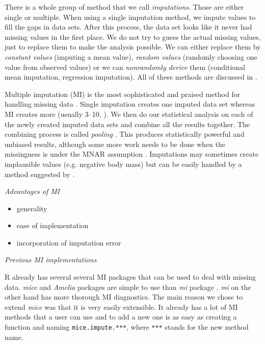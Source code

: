 \documentclass[hidelinks,a4paper]{article}
\renewcommand{\subsection}[1]{%
\bigskip
\begin{center}
\begin{large}
\normalfont\itshape #1
\end{large}
\end{center}}
\begin{document}
\begin{multicols}{2}
There is a whole group of method that we call \emph{imputations}. Those are either single or multiple. When using a single imputation method, we impute values to fill the gaps in data sets. After this process, the data set looks like it never had missing values in the first place. We do not try to guess the actual missing values, just to replace them to make the analysis possible. We can either replace them by \emph{constant values} (imputing a mean value), \emph{random values} (randomly choosing one value from observed values) or we can \emph{nonrandomly derive} them (conditional mean imputation, regression imputation). All of these methods are discussed in \cite{Donders06}.

Multiple imputation (MI) is the most sophisticated and praised method for handling missing data \cite{allison2001missing,Schafer1997}. Single imputation creates one imputed data set whereas MI creates more (usually 3--10, \cite{Donders06}). We then do our statistical analysis on each of the newly created imputed data sets and combine all the results together. The combining process is called \emph{pooling} \cite{Buuren2011}. This produces statistically powerful and unbiased results, although some more work needs to be done when the missingness is under the MNAR assumption \cite{Buuren2011}. Imputations may sometimes create implausible values (e.g. negative body mass) but can be easily handled by a method suggested by \cite{Hussain2010}.

\subsection{Advantages of MI}
\begin{itemize}
	\item{generality}
	\item{ease of implementation}
	\item{incorporation of imputation error}
\end{itemize}

\subsection{Previous MI implementations}
R already has several several MI packages that can be used to deal with missing data. \emph{mice} \cite{Buuren2011} and \emph{Amelia} \cite{ameliaR} packages are simple to use than \emph{mi} package \cite{miR}. \emph{mi} on the other hand has more thorough MI diagnostics. The main reason we chose to extend \emph{mice} was that it is very easily extensible. It already has a lot of MI methods that a user can use and to add a new one is as easy as creating a function and naming \texttt{mice.impute.***}, where \texttt{***} stands for the new method name.


\end{multicols}
\end{document}
